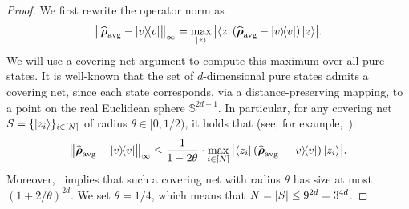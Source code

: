 \documentclass{article}
\begin{document}
\begin{proof}
    We first rewrite the operator norm as
    \begin{equation*}
        \norm{\widehat{\boldsymbol{\rho}}_{\mathrm{avg}} - \ketbra{v}}_{\infty}
        = \max_{\ket{z}} \abs{\bra{z} (\widehat{\boldsymbol{\rho}}_{\mathrm{avg}} - \ketbra{v}) \ket{z}}.
    \end{equation*}
    We will use a covering net argument to compute this maximum over all pure states. It is well-known that the set of $d$-dimensional pure states admits a covering net, since each state corresponds, via a distance-preserving mapping, to a point on the real Euclidean sphere $\mathbb{S}^{2d-1}$. In particular, for any covering net $S = \{\ket{z_i}\}_{i \in [N]}$ of radius $\theta \in [0, 1/2)$, it holds that (see, for example,~\cite[Lemma 4.4.2]{Ver18}):
    \begin{equation}
        \label{eq:net-argument}
        \norm{\widehat{\boldsymbol{\rho}}_{\mathrm{avg}} - \ketbra{v}}_{\infty} \leq \frac{1}{1 - 2\theta} \cdot \max_{i \in [N]} \abs{\bra{z_i} (\widehat{\boldsymbol{\rho}}_{\mathrm{avg}} - \ketbra{v}) \ket{z_i}}.
    \end{equation}
    Moreover,~\cite[Corollary 4.2.11]{Ver18} implies that such a covering net with radius $\theta$ has size at most $(1 + 2/\theta)^{2d}$. We set $\theta = 1/4$, which means that $N = \abs{S} \leq 9^{2d} = 3^{4d}$.
    

\end{proof}
\end{document}
